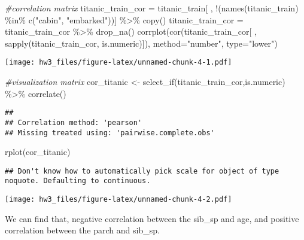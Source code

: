 \documentclass[
]{article}
\newenvironment{Shaded}{\begin{snugshade}}{\end{snugshade}}
\newcommand{\AttributeTok}[1]{\textcolor[rgb]{0.77,0.63,0.00}{#1}}
\newcommand{\CommentTok}[1]{\textcolor[rgb]{0.56,0.35,0.01}{\textit{#1}}}
\newcommand{\FunctionTok}[1]{\textcolor[rgb]{0.00,0.00,0.00}{#1}}
\newcommand{\NormalTok}[1]{#1}
\newcommand{\OtherTok}[1]{\textcolor[rgb]{0.56,0.35,0.01}{#1}}
\newcommand{\SpecialCharTok}[1]{\textcolor[rgb]{0.00,0.00,0.00}{#1}}
\newcommand{\StringTok}[1]{\textcolor[rgb]{0.31,0.60,0.02}{#1}}
\begin{document}
\begin{Shaded}
\begin{Highlighting}[]
\CommentTok{\#correlation matrix}
\NormalTok{titanic\_train\_cor }\OtherTok{=}\NormalTok{ titanic\_train[ , }\SpecialCharTok{!}\NormalTok{(}\FunctionTok{names}\NormalTok{(titanic\_train) }\SpecialCharTok{\%in\%} \FunctionTok{c}\NormalTok{(}\StringTok{"cabin"}\NormalTok{, }\StringTok{"embarked"}\NormalTok{))] }\SpecialCharTok{\%\textgreater{}\%} \FunctionTok{copy}\NormalTok{()}
\NormalTok{titanic\_train\_cor }\OtherTok{=}\NormalTok{ titanic\_train\_cor }\SpecialCharTok{\%\textgreater{}\%} \FunctionTok{drop\_na}\NormalTok{()}
\FunctionTok{corrplot}\NormalTok{(}\FunctionTok{cor}\NormalTok{(titanic\_train\_cor[ , }\FunctionTok{sapply}\NormalTok{(titanic\_train\_cor, is.numeric)]), }
         \AttributeTok{method=}\StringTok{"number"}\NormalTok{, }\AttributeTok{type=}\StringTok{"lower"}\NormalTok{)}
\end{Highlighting}
\end{Shaded}

\texttt{[image: hw3\_files/figure-latex/unnamed-chunk-4-1.pdf]}

\begin{Shaded}
\begin{Highlighting}[]
\CommentTok{\#visualization matrix}
\NormalTok{cor\_titanic }\OtherTok{\textless{}{-}} \FunctionTok{select\_if}\NormalTok{(titanic\_train\_cor,is.numeric) }\SpecialCharTok{\%\textgreater{}\%} \FunctionTok{correlate}\NormalTok{()}
\end{Highlighting}
\end{Shaded}

\begin{verbatim}
## 
## Correlation method: 'pearson'
## Missing treated using: 'pairwise.complete.obs'
\end{verbatim}

\begin{Shaded}
\begin{Highlighting}[]
\FunctionTok{rplot}\NormalTok{(cor\_titanic)}
\end{Highlighting}
\end{Shaded}

\begin{verbatim}
## Don't know how to automatically pick scale for object of type noquote. Defaulting to continuous.
\end{verbatim}

\texttt{[image: hw3\_files/figure-latex/unnamed-chunk-4-2.pdf]}

We can find that, negative correlation between the sib\_sp and age, and
positive correlation between the parch and sib\_sp.
\end{document}
